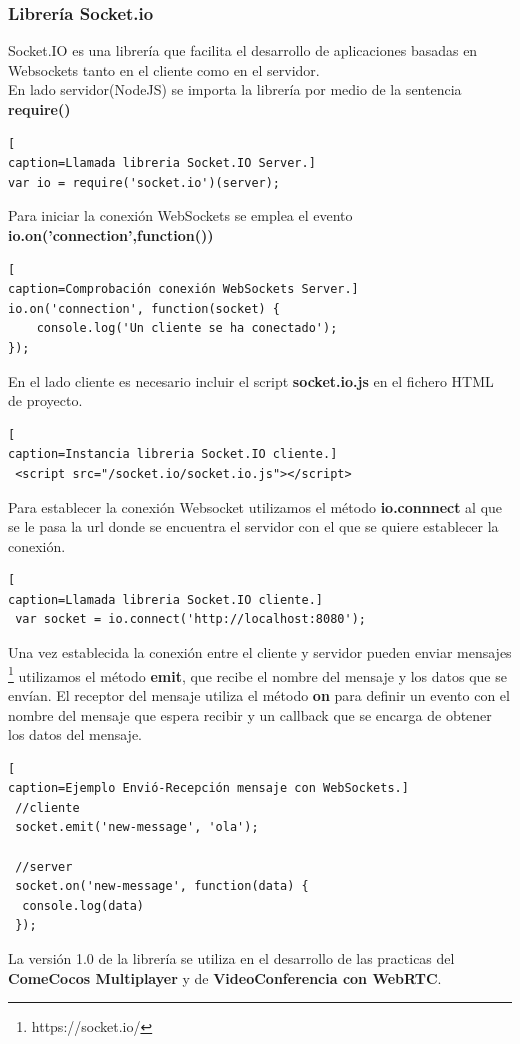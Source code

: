 \subsubsection*{Librería Socket.io}
Socket.IO\cite{socketiO} es una librería que facilita el desarrollo de aplicaciones basadas en Websockets tanto en el cliente como en el servidor.
\\En lado servidor(NodeJS) se importa la librería por medio de la sentencia \textbf{require()}
\begin{lstlisting}[
caption=Llamada libreria Socket.IO Server.]
var io = require('socket.io')(server); 
\end{lstlisting}
Para iniciar la conexión WebSockets se emplea el evento \textbf{io.on('connection',function())} 
\begin{lstlisting}[
caption=Comprobación conexión WebSockets Server.]
io.on('connection', function(socket) {  
    console.log('Un cliente se ha conectado');
});
\end{lstlisting}
En el lado cliente es necesario incluir el script \textbf{socket.io.js} en el fichero HTML de proyecto.
\begin{lstlisting}[
caption=Instancia libreria Socket.IO cliente.]
 <script src="/socket.io/socket.io.js"></script> 
\end{lstlisting}
Para establecer la conexión Websocket utilizamos el método \textbf{io.connnect} al que se le pasa la url donde se encuentra el servidor con el que se quiere establecer la conexión.
\begin{lstlisting}[
caption=Llamada libreria Socket.IO cliente.]
 var socket = io.connect('http://localhost:8080');
\end{lstlisting}
Una vez establecida la conexión entre el cliente y servidor pueden enviar mensajes \footnote{https://socket.io/} utilizamos el método \textbf{emit}, que recibe el nombre del mensaje y los datos que se envían. El receptor del mensaje utiliza el método \textbf{on} para definir un evento  con el nombre del mensaje que espera recibir y un callback que se encarga de obtener los datos del mensaje.
\begin{lstlisting}[
caption=Ejemplo Envió-Recepción mensaje con WebSockets.]
 //cliente 
 socket.emit('new-message', 'ola');
 
 //server
 socket.on('new-message', function(data) {  
  console.log(data)
 });
\end{lstlisting}
La versión 1.0 de la librería se utiliza en el desarrollo de las practicas del \textbf{ComeCocos Multiplayer} y de \textbf{VideoConferencia con WebRTC}.

